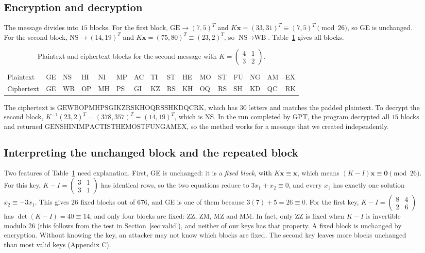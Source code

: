 \documentclass[11pt,a4paper]{article}
\newcommand{\smat}[1]{\left(\begin{smallmatrix}#1\end{smallmatrix}\right)}
\newcommand{\x}{\mathbf{x}}   %
\theoremstyle{plain}
\theoremstyle{definition}
\begin{document}
\subsection{Encryption and decryption}

The message divides into $15$ blocks. For the first block, $\text{GE}\longrightarrow(7,5)^T$ and
$K\x=(33,31)^T\equiv(7,5)^T\pmod{26}$, so GE is unchanged. For the second block, $\text{NS}\longrightarrow(14,19)^T$ and $K\x=(75,80)^T\equiv(23,2)^T$, so $\text{NS}\longrightarrow\text{WB}$. Table~\ref{tab:second} gives all blocks.

\begin{table}[ht]
\centering
\small
\caption{Plaintext and ciphertext blocks for the second message with $K=\smat{4&1\\3&2}$.}
\label{tab:second}
\setlength{\tabcolsep}{3.2pt}
\begin{tabular}{l *{15}{l}}
\toprule
Plaintext  & GE & NS & HI & NI & MP & AC & TI & ST & HE & MO & ST & FU & NG & AM & EX\\
Ciphertext & GE & WB & OP & MH & PS & GI & KZ & RS & KH & OQ & RS & SH & KD & QC & RK\\
\bottomrule
\end{tabular}
\end{table}

The ciphertext is $\text{GEWBOPMHPSGIKZRSKHOQRSSHKDQCRK}$, which has $30$ letters and matches the padded plaintext. To decrypt the second block, $K^{-1}(23,2)^T=(378,357)^T\equiv(14,19)^T$, which is NS. In the run completed by GPT, the program decrypted all $15$ blocks and returned $\text{GENSHINIMPACTISTHEMOSTFUNGAMEX}$, so the method works for a message that we created independently.

\subsection{Interpreting the unchanged block and the repeated block}

Two features of Table~\ref{tab:second} need explanation. First, GE is unchanged: it is a \emph{fixed block}, with $K\x\equiv\x$, which means $(K-I)\x\equiv\mathbf{0}\pmod{26}$. For this key, $K-I=\smat{3&1\\3&1}$ has identical rows, so the two equations reduce to $3x_1+x_2\equiv0$, and every $x_1$ has exactly one solution $x_2\equiv-3x_1$. This gives $26$ fixed blocks out of $676$, and GE is one of them because $3(7)+5=26\equiv0$. For the first key, $K-I=\smat{8&4\\2&6}$ has $\det(K-I)=40\equiv14$, and only four blocks are fixed: ZZ, ZM, MZ and MM. In fact, only ZZ is fixed when $K-I$ is invertible modulo $26$ (this follows from the test in Section~\ref{sec:valid}), and neither of our keys has that property. A fixed block is unchanged by encryption. Without knowing the key, an attacker may not know which blocks are fixed. The second key leaves more blocks unchanged than most valid keys (Appendix C).
\end{document}
